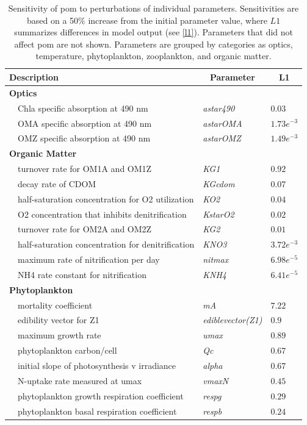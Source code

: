 \documentclass[review]{elsarticle}\usepackage[]{graphicx}\usepackage[]{color}
\begin{document}
\begin{table}[!tbp]
{\footnotesize
\caption{Sensitivity of \ac{pom} to perturbations of individual parameters.  Sensitivities are based on a 50\% increase from the initial parameter value, where $L1$ summarizes differences in model output (see \cref{l1}).  Parameters that did not affect \ac{pom} are not shown.  Parameters are grouped by categories as optics, temperature, phytoplankton, zooplankton, and organic matter.\label{tab:om1sens}} 
\begin{center}
\begin{tabular}{lll}
\hline\hline
\multicolumn{1}{l}{Description}&\multicolumn{1}{c}{Parameter}&\multicolumn{1}{c}{L1}\tabularnewline
\hline
{\bfseries Optics}&&\tabularnewline
~~Chla specific absorption at 490 nm&\textit{astar490}&$0.03$\tabularnewline
~~OMA specific absorption at 490 nm&\textit{astarOMA}&$1.73e^{-3}$\tabularnewline
~~OMZ specific absorption at 490 nm&\textit{astarOMZ}&$1.49e^{-3}$\tabularnewline
\hline
{\bfseries Organic Matter}&&\tabularnewline
~~turnover rate for OM1A and OM1Z&\textit{KG1}&$0.92$\tabularnewline
~~decay rate of CDOM&\textit{KGcdom}&$0.07$\tabularnewline
~~half-saturation concentration for O2 utilization&\textit{KO2}&$0.04$\tabularnewline
~~O2 concentration that inhibits denitrification&\textit{KstarO2}&$0.02$\tabularnewline
~~turnover rate for OM2A and OM2Z&\textit{KG2}&$0.01$\tabularnewline
~~half-saturation concentration for denitrification&\textit{KNO3}&$3.72e^{-3}$\tabularnewline
~~maximum rate of nitrification per day&\textit{nitmax}&$6.98e^{-5}$\tabularnewline
~~NH4 rate constant for nitrification&\textit{KNH4}&$6.41e^{-5}$\tabularnewline
\hline
{\bfseries Phytoplankton}&&\tabularnewline
~~mortality coefficient&\textit{mA}&$7.22$\tabularnewline
~~edibility vector for Z1&\textit{ediblevector(Z1)}&$0.9$\tabularnewline
~~maximum growth rate&\textit{umax}&$0.89$\tabularnewline
~~phytoplankton carbon/cell&\textit{Qc}&$0.67$\tabularnewline
~~initial slope of photosynthesis v irradiance&\textit{alpha}&$0.67$\tabularnewline
~~N-uptake rate measured at umax&\textit{vmaxN}&$0.45$\tabularnewline
~~phytoplankton growth respiration coefficient&\textit{respg}&$0.29$\tabularnewline
~~phytoplankton basal respiration coefficient&\textit{respb}&$0.24$\tabularnewline

\end{tabular}
\end{center}}
\end{table}
\end{document}
